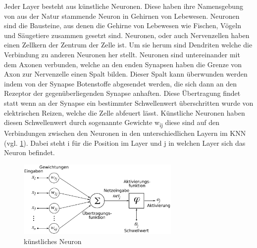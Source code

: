 \documentclass{llncs}
\begin{document}
Jeder Layer besteht aus künstliche Neuronen. Diese haben ihre Namensgebung von aus der Natur stammende Neuron in Gehirnen von Lebewesen. Neuronen sind die Bausteine, aus denen die Gehirne von Lebewesen wie Fischen, Vögeln und Säugetiere zusammen gesetzt sind. Neuronen, oder auch Nervenzellen haben einen Zellkern der Zentrum der Zelle ist. Um sie herum sind Dendriten welche die Verbindung zu anderen Neuronen her stellt. Neuronen sind untereinander mit dem Axonen verbunden, welche an den enden Synapsen haben die Grenze von Axon zur Nervenzelle einen Spalt bilden. Dieser Spalt kann überwunden werden indem von der Synapse Botenstoffe abgesendet werden, die sich dann an den Rezeptor der gegenüberliegenden Synapse anhaften. Diese Übertragung findet statt wenn an der Synapse ein bestimmter Schwellenwert überschritten wurde von elektrischen Reizen, welche die Zelle abfeuert lässt. Künstliche Neuronen haben diesen Schwellenwert durch sogenannte Gewichte w\textsubscript{ij} diese sind auf den Verbindungen zwischen den Neuronen in den unterschiedlichen Layern im KNN (vgl. \ref{fig:Bild2}). Dabei steht i für die Position im Layer und j in welchen Layer sich das Neuron befindet.


\begin{figure}[htbp] 
	\centering
	\includegraphics[width=0.7\textwidth]{Neuron.png}
	\caption{künstliches Neuron}
	\label{fig:Bild2}
\end{figure}
\end{document}
